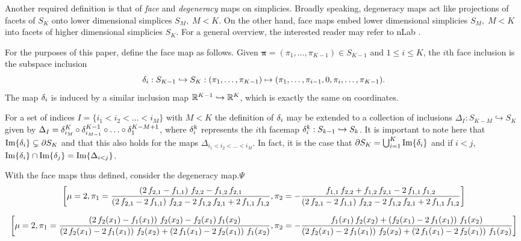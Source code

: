 \documentclass[12pt,letterpaper]{amsbook}
\begin{document}
	Another required definition is that of \textit{face} and \textit{degeneracy} maps on simplicies. Broadly speaking, degeneracy maps act like projections of facets of \( S_K \) onto lower dimensional simplices \( S_{M},\;M<K \). On the other hand, face maps embed lower dimensional simplicies \( S_{M},\;M<K \) into facets of higher dimensional simplicies \( S_K \). For a general overview, the interested reader may refer to nLab . 
	
	For the purposes of this paper, define the face map as follows.  Given \(\bm\pi = (\pi_1, \ldots, \pi_{K-1}) \in S_{K-1}\)  and \( 1\leq i\leq K \), the $i$th face inclusion is the subspace inclusion
	\begin{equation}\label{eqn:faceMapDefn}
	\delta_i:S_{K-1}\hookrightarrow S_K:(\pi_1, \ldots, \pi_{K-1})\mapsto (\pi_1, \ldots,\pi_{i-1},0,\pi_i,\ldots, \pi_{K-1}).
	\end{equation}
	The map \( \delta_i \) is induced by a similar inclusion map \( \mathbb R^{K-1}\hookrightarrow\mathbb R^K \), which is exactly the same on coordinates.  
	
	For a set of indices \( I=\{i_1<i_2<\ldots<i_M\}\) with \(M<K\) the definition of \( \delta_i \) may be extended to a collection of inclusions \( \Delta_I:S_{K-M} \hookrightarrow S_K \) given by \( \Delta_I = \delta_{i_M}^{K}\circ\delta_{i_{M-1}}^{K-1}\circ\ldots\circ\delta_1^{K-M+1} \), where \( \delta_i^{k} \) represents the $i$th facemap \( \delta_i^k:S_{k-1}\hookrightarrow S_k \).  It is important to note here that \( \Im{\delta_i}\subsetneq\partial S_K \) and that this also holds for the maps \( \Delta_{i_1<i_2< \ldots <i_M } \). In fact, it is the case that \(\partial S_K = \bigcup_{i=1}^{K}\Im{\delta_i}\) and if \( i<j \), \( \Im{\delta_i}\cap\Im{\delta_j} = \Im{\Delta_{i<j}} \).
		
	With the face maps thus defined, consider the degeneracy map.\( \Psi \)
\[  \left[ \mu=2 , \pi_{1}={{\left(2\,f_{2,1}-f_{1,1}\right)\,f
		_{2,2}-f_{1,2}\,f_{2,1}}\over{\left(2\,f_{2,1}-2\,f_{1,1}\right)\,f
		_{2,2}-2\,f_{1,2}\,f_{2,1}+2\,f_{1,1}\,f_{1,2}}} , \pi_{2}=-{{f_{1,1
		}\,f_{2,2}+f_{1,2}\,f_{2,1}-2\,f_{1,1}\,f_{1,2}}\over{\left(2\,f_{2,
			1}-2\,f_{1,1}\right)\,f_{2,2}-2\,f_{1,2}\,f_{2,1}+2\,f_{1,1}\,f_{1,2
}}} \right]  \]

\[ \left[ \mu=2 , \pi_{1}={{\left(2\,f_{2}(x_{1})-f_{1}(x_{1})
		\right)\,f_{2}(x_{2})-f_{2}(x_{1})\,f_{1}(x_{2})}\over{\left(2\,f_{2
		}(x_{1})-2\,f_{1}(x_{1})\right)\,f_{2}(x_{2})+\left(2\,f_{1}(x_{1})-
		2\,f_{2}(x_{1})\right)\,f_{1}(x_{2})}} , \pi_{2}=-{{f_{1}(x_{1})\,f
		_{2}(x_{2})+\left(f_{2}(x_{1})-2\,f_{1}(x_{1})\right)\,f_{1}(x_{2})
	}\over{\left(2\,f_{2}(x_{1})-2\,f_{1}(x_{1})\right)\,f_{2}(x_{2})+
		\left(2\,f_{1}(x_{1})-2\,f_{2}(x_{1})\right)\,f_{1}(x_{2})}}
\right]  \]
\end{document}
